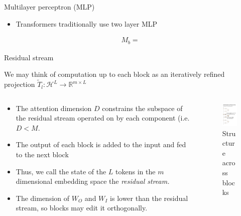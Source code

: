 \begin{frame}{Multilayer perceptron (MLP)}
\begin{itemize}
    \item Transformers traditionally use two layer MLP
\end{itemize}
    \begin{align}
        M_b = 
    \end{align}
\end{frame}

\begin{frame}{Residual stream}

We may think of computation up to each block as an iteratively refined projection $\tilde T_l: \mathcal H^L \to \mathbb R^{m \times L}$
\begin{columns}
\begin{column}{.5\textwidth}
\begin{itemize}
    \item The attention dimension $D$ constrains the subspace of the residual stream operated on by each component (i.e. $D < M$.
    \item The output of each block is added to the input and fed to the next block
    \item Thus, we call the state of the $L$ tokens in the $m$ dimensional embedding space the {\it residual stream.}
    \item The dimension of $W_O$ and $W_I$ is lower than the residual stream, so blocks may edit it orthogonally.
\end{itemize}
\end{column}
\begin{column}{.5\textwidth}
\begin{figure}
    \includegraphics[width = 3cm]{img/transblock.png}
    \caption*{Structure across blocks \citep{Nanda-wv}}
\end{figure}
\end{column}
\end{columns}
\end{frame}


